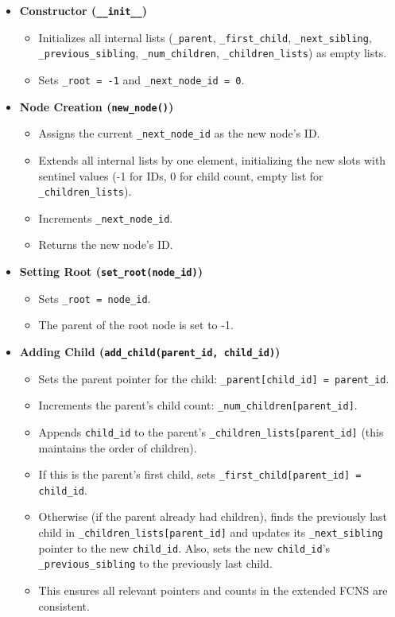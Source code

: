 \documentclass{article}
\begin{document}
\begin{itemize}
    \item \textbf{Constructor (\texttt{\_\_init\_\_})}
    \begin{itemize}
        \item Initializes all internal lists (\texttt{\_parent}, \texttt{\_first\_child}, \texttt{\_next\_sibling}, \texttt{\_previous\_sibling}, \texttt{\_num\_children}, \texttt{\_children\_lists}) as empty lists.
        \item Sets \texttt{\_root = -1} and \texttt{\_next\_node\_id = 0}.
    \end{itemize}

    \item \textbf{Node Creation (\texttt{new\_node()})}
    \begin{itemize}
        \item Assigns the current \texttt{\_next\_node\_id} as the new node's ID.
        \item Extends all internal lists by one element, initializing the new slots with sentinel values (-1 for IDs, 0 for child count, empty list for \texttt{\_children\_lists}).
        \item Increments \texttt{\_next\_node\_id}.
        \item Returns the new node's ID.
    \end{itemize}

    \item \textbf{Setting Root (\texttt{set\_root(node\_id)})}
    \begin{itemize}
        \item Sets \texttt{\_root = node\_id}.
        \item The parent of the root node is set to -1.
    \end{itemize}

    \item \textbf{Adding Child (\texttt{add\_child(parent\_id, child\_id)})}
    \begin{itemize}
        \item Sets the parent pointer for the child: \texttt{\_parent[child\_id] = parent\_id}.
        \item Increments the parent's child count: \texttt{\_num\_children[parent\_id]}.
        \item Appends \texttt{child\_id} to the parent's \texttt{\_children\_lists[parent\_id]} (this maintains the order of children).
        \item If this is the parent's first child, sets \texttt{\_first\_child[parent\_id] = child\_id}.
        \item Otherwise (if the parent already had children), finds the previously last child in \texttt{\_children\_lists[parent\_id]} and updates its \texttt{\_next\_sibling} pointer to the new \texttt{child\_id}. Also, sets the new \texttt{child\_id}'s \texttt{\_previous\_sibling} to the previously last child.
        \item This ensures all relevant pointers and counts in the extended FCNS are consistent.
    \end{itemize}


\end{itemize}
\end{document}

